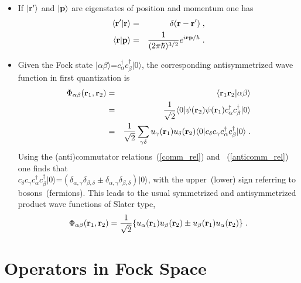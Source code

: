 \begin{itemize}
\item
 If $\vert{\bf r}'\rangle$ and $\vert{\bf p}\rangle$ are eigenstates of position and momentum
one has
\begin{eqnarray}
  \langle {\bf r}' \vert {\bf r} \rangle &=& \delta({\bf r} - {\bf r}') \; ,
\\
  \langle {\bf r}
   \vert {\bf p} \rangle &=& \frac{1}{(2\pi\hbar)^{3/2}}e^{i {\bf r} {\bf p}/\hbar} \; .
\end{eqnarray}

\item
 Given the Fock state $\vert \alpha \beta \rangle$=$c^\dag_\alpha c^\dag_\beta \vert0\rangle$, the corresponding antisymmetrized wave function in first quantization is
\begin{eqnarray}
  \Phi_{\alpha \beta}({\bf r}_1, {\bf r}_2)
     &=&\langle {\bf r}_1 {\bf r}_2 \vert \alpha \beta\rangle 
  \\
    &=& \frac{1}{\sqrt{2}} \langle 0 \vert \psi({\bf r}_2) \psi({\bf r}_1)  c^\dag_\alpha c^\dag_\beta \vert0\rangle
  \\
    &=&  \frac{1}{\sqrt{2}}  \sum_{\gamma \delta} u_{\gamma}({\bf r}_1) u_{\delta}({\bf r}_2)
    \langle 0 \vert c_\delta c_\gamma  c^\dag_\alpha c^\dag_\beta \vert0\rangle \; .
\end{eqnarray}
Using the (anti)commutator relations~(\ref{comm_rel}) and ~(\ref{anticomm_rel}) one finds that \\
$c_\delta c_\gamma c^\dag_\alpha c^\dag_\beta \vert0\rangle$=$\left(\delta_{\alpha,\gamma}\delta_{\beta,\delta}
\pm\delta_{\alpha,\gamma}\delta_{\beta,\delta}\right)\vert0\rangle$,
with the upper~(lower) sign referring to bosons~(fermions). This leads
to the usual symmetrized and antisymmetrized product wave functions of 
Slater type,
\begin{equation}
  \Phi_{\alpha \beta}({\bf r}_1, {\bf r}_2)
    = \frac{1}{\sqrt{2}} \{ u_{\alpha}({\bf r}_1) u_{\beta}({\bf r}_2) 
                          \pm  u_{\beta}({\bf r}_1) u_{\alpha}({\bf r}_2) \}  \; .
\end{equation}


\end{itemize}




\section{Operators in Fock Space}

